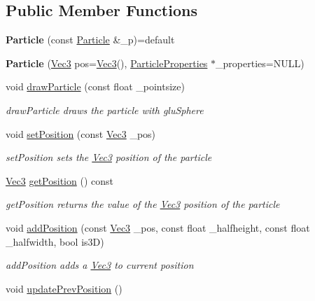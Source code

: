 \subsection*{Public Member Functions}
\begin{DoxyCompactItemize}
\item 
\hypertarget{classParticle_aed0e1cc39738cf096db2b4d5f9876ac4}{{\bfseries Particle} (const \hyperlink{classParticle}{Particle} \&\-\_\-p)=default}\label{classParticle_aed0e1cc39738cf096db2b4d5f9876ac4}

\item 
\hypertarget{classParticle_a26524259b848fff0b502f6b921eef46d}{{\bfseries Particle} (\hyperlink{classVec3}{Vec3} pos=\hyperlink{classVec3}{Vec3}(), \hyperlink{classParticleProperties}{Particle\-Properties} $\ast$\-\_\-properties=N\-U\-L\-L)}\label{classParticle_a26524259b848fff0b502f6b921eef46d}

\item 
void \hyperlink{classParticle_a229585bba32aeaa9d17f66312379c015}{draw\-Particle} (const float \-\_\-pointsize)
\begin{DoxyCompactList}\small\item\em draw\-Particle draws the particle with glu\-Sphere \end{DoxyCompactList}\item 
void \hyperlink{classParticle_a308e091286c7c498080aa290243bf70d}{set\-Position} (const \hyperlink{classVec3}{Vec3} \-\_\-pos)
\begin{DoxyCompactList}\small\item\em set\-Position sets the \hyperlink{classVec3}{Vec3} position of the particle \end{DoxyCompactList}\item 
\hyperlink{classVec3}{Vec3} \hyperlink{classParticle_a471c13f167fe56ac9b5fbea5b66c07d1}{get\-Position} () const 
\begin{DoxyCompactList}\small\item\em get\-Position returns the value of the \hyperlink{classVec3}{Vec3} position of the particle \end{DoxyCompactList}\item 
void \hyperlink{classParticle_add0cb538c87ab21ba3345595adaf810e}{add\-Position} (const \hyperlink{classVec3}{Vec3} \-\_\-pos, const float \-\_\-halfheight, const float \-\_\-halfwidth, bool is3\-D)
\begin{DoxyCompactList}\small\item\em add\-Position adds a \hyperlink{classVec3}{Vec3} to current position \end{DoxyCompactList}\item 
\hypertarget{classParticle_a6b0a3046a4ab31cf0f02f883eb57acec}{void \hyperlink{classParticle_a6b0a3046a4ab31cf0f02f883eb57acec}{update\-Prev\-Position} ()}\label{classParticle_a6b0a3046a4ab31cf0f02f883eb57acec}


\end{DoxyCompactItemize}
